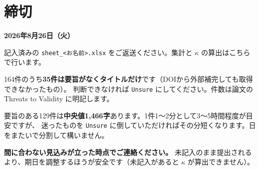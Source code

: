 \documentclass[a4paper]{ltjsarticle}
\newcommand{\keybox}[1]{%
  \par\medskip
  \noindent\colorbox{soft}{%
    \begin{minipage}{\dimexpr\linewidth-2\fboxsep\relax}
      \vspace{2pt}\centering\bfseries\large #1\vspace{4pt}
    \end{minipage}}%
  \par\medskip}
\newcommand{\notebox}[1]{%
  \par\medskip
  \noindent\colorbox{warn}{%
    \begin{minipage}{\dimexpr\linewidth-2\fboxsep\relax}
      \vspace{4pt}#1\vspace{4pt}
    \end{minipage}}%
  \par\medskip}
\begin{document}
\section{締切}

\keybox{2026年8月26日（火）}

\noindent
記入済みの \texttt{sheet\_<お名前>.xlsx} をご返送ください。集計と $\kappa$ の算出はこちらで行います。

\medskip
\noindent
164件のうち\textbf{35件は要旨がなくタイトルだけ}です（DOIから外部補完しても取得できなかったもの）。
判断できなければ \texttt{Unsure} にしてください。件数は論文の Threats to Validity に明記します。

\medskip
\noindent
要旨のある129件は\textbf{中央値1,466字}あります。1件1〜2分として3〜5時間程度が目安ですが、
迷ったものを \texttt{Unsure} に倒していただければその分短くなります。日をまたいで分割して構いません。

\notebox{\textbf{間に合わない見込みが立った時点でご連絡ください。}
未記入のまま提出されるより、期日を調整するほうが安全です（未記入があると $\kappa$ が算出できません）。}
\end{document}
